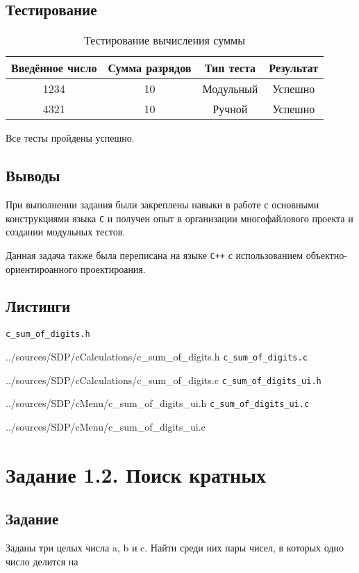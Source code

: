 \documentclass[12pt,a4paper]{report}
\begin{document}
\subsection{Тестирование}
\begin{table}[h]
\caption{Тестирование вычисления суммы}
\label{sum_of_digits_test}
\begin{tabular}{|c|c|c|c|}
\hline 
Введённое число & Сумма разрядов & Тип теста & Результат \\ 
\hline 
1234 & 10 & Модульный & Успешно \\ 
\hline 
4321 & 10 & Ручной & Успешно \\ 
\hline 
\end{tabular} 
\end{table}
Все тесты пройдены успешно.
\subsection{Выводы}
\hspace{\parindent}При выполнении задания были закреплены навыки в работе с основными конструкциями языка \texttt{C} и получен опыт в организации многофайлового проекта и создании модульных тестов.

Данная задача также была переписана на языке \verb|C++| с использованием объектно-ориентироанного проектироания.
\newpage
\subsection{Листинги}
\verb+c_sum_of_digits.h+

{../sources/SDP/cCalculations/c_sum_of_digits.h}
\verb+c_sum_of_digits.c+

{../sources/SDP/cCalculations/c_sum_of_digits.c}
\verb+c_sum_of_digits_ui.h+

{../sources/SDP/cMenu/c_sum_of_digits_ui.h}
\verb+c_sum_of_digits_ui.c+

{../sources/SDP/cMenu/c_sum_of_digits_ui.c}




\newpage
\section{Задание 1.2. Поиск кратных}
\subsection{Задание}
\hspace{\parindent}Заданы три целых числа a, b и c. Найти среди них пары чисел, в которых одно число делится на 
\end{document}
